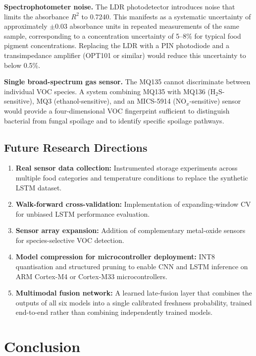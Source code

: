 \documentclass{ieeeaccess}
\begin{document}
\textbf{Spectrophotometer noise.} The LDR photodetector introduces noise that limits the absorbance $R^2$ to 0.7240. This manifests as a systematic uncertainty of approximately $\pm$0.03 absorbance units in repeated measurements of the same sample, corresponding to a concentration uncertainty of 5--8\% for typical food pigment concentrations. Replacing the LDR with a PIN photodiode and a transimpedance amplifier (OPT101 or similar) would reduce this uncertainty to below 0.5\%.

\textbf{Single broad-spectrum gas sensor.} The MQ135 cannot discriminate between individual VOC species. A system combining MQ135 with MQ136 (H$_2$S-sensitive), MQ3 (ethanol-sensitive), and an MICS-5914 (NO$_x$-sensitive) sensor would provide a four-dimensional VOC fingerprint sufficient to distinguish bacterial from fungal spoilage and to identify specific spoilage pathways.

\subsection{Future Research Directions}

\begin{enumerate}
  \item \textbf{Real sensor data collection:} Instrumented storage experiments across multiple food categories and temperature conditions to replace the synthetic LSTM dataset.
  \item \textbf{Walk-forward cross-validation:} Implementation of expanding-window CV for unbiased LSTM performance evaluation.
  \item \textbf{Sensor array expansion:} Addition of complementary metal-oxide sensors for species-selective VOC detection.
  \item \textbf{Model compression for microcontroller deployment:} INT8 quantisation and structured pruning to enable CNN and LSTM inference on ARM Cortex-M4 or Cortex-M33 microcontrollers.
  \item \textbf{Multimodal fusion network:} A learned late-fusion layer that combines the outputs of all six models into a single calibrated freshness probability, trained end-to-end rather than combining independently trained models.
\end{enumerate}

\section{Conclusion}
\label{sec:conclusion}
\end{document}
